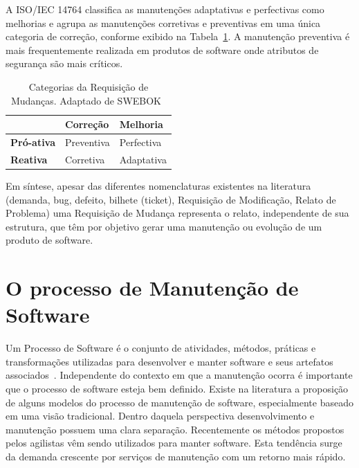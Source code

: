 A ISO/IEC 14764 classifica as manutenções adaptativas e perfectivas como melhorias e agrupa as
manutenções corretivas e preventivas em uma única categoria de correção, conforme exibido na
Tabela~\ref{tab:categorias_requisicao_mudanca}. A manutenção preventiva é mais frequentemente
realizada em produtos de software onde atributos de segurança são mais críticos.

\begin{table}[htpb]

	\centering
	\caption{Categorias da Requisição de Mudanças. Adaptado de SWEBOK~\cite{4425813}}\label{tab:categorias_requisicao_mudanca}
	\begin{tabular}{l|l|l|}
		\cline{2-3}
	 & \textbf{Correção} & \textbf{Melhoria} \\ \hline
	 \multicolumn{1}{|l|}{\textbf{Pró-ativa}} & Preventiva & Perfectiva \\ \hline
	 \multicolumn{1}{|l|}{\textbf{Reativa}} & Corretiva & Adaptativa \\ \hline
	\end{tabular}
 \end{table} 

Em síntese, apesar das diferentes nomenclaturas existentes na literatura (demanda, bug, defeito, bilhete (ticket),
Requisição de Modificação, Relato de Problema) uma Requisição de Mudança representa o relato,
independente de sua estrutura, que têm por objetivo gerar uma manutenção ou evolução de um produto
de software. 
 
 \section{O processo de Manutenção de Software}
\label{sec:o_processo_de_manutecao_de_software}

Um Processo de Software é o conjunto de atividades, métodos, práticas e
transformações utilizadas para desenvolver e manter software e seus
artefatos associados~\cite{paulk1993key}.  Independente do contexto em que a
manutenção ocorra é importante que o processo de software esteja
bem definido. Existe na literatura a proposição de alguns modelos do processo de manutenção de
software, especialmente baseado em uma visão tradicional. Dentro daquela perspectiva desenvolvimento
e manutenção possuem uma clara separação. Recentemente os métodos propostos pelos agilistas vêm sendo
utilizados para manter software. Esta tendência surge da demanda crescente por serviços de
manutenção com um retorno mais rápido. 

